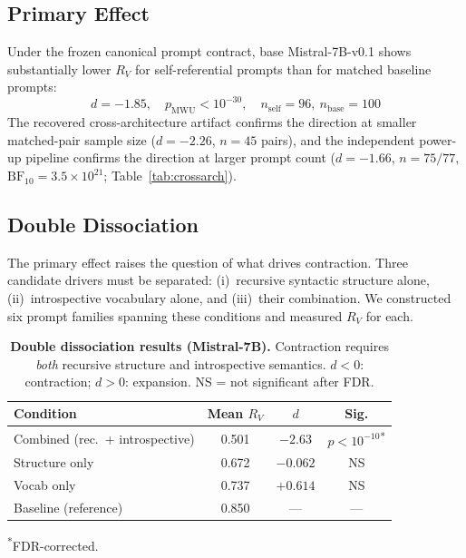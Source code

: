 \documentclass{article}
\newcommand{\RV}{R_V}
\newcommand{\dcohen}{d}
\begin{document}
\subsection{Primary Effect}
\label{sec:primary}

Under the frozen canonical prompt contract, base Mistral-7B-v0.1 shows substantially lower $\RV$
for self-referential prompts than for matched baseline prompts:
\begin{equation}
\dcohen = -1.85, \quad p_{\mathrm{MWU}} < 10^{-30}, \quad n_\mathrm{self}=96,\ n_\mathrm{base}=100
\label{eq:primary}
\end{equation}
The recovered cross-architecture artifact confirms the direction at smaller matched-pair sample size
($\dcohen = -2.26$, $n = 45$ pairs), and the independent power-up pipeline confirms the direction
at larger prompt count
($\dcohen = -1.66$, $n = 75/77$, $\mathrm{BF}_{10} = 3.5 \times 10^{21}$;
Table~\ref{tab:crossarch}).

\subsection{Double Dissociation}
\label{sec:dissociation}


The primary effect raises the question of what drives contraction.
Three candidate drivers must be separated: (i)~recursive syntactic structure alone,
(ii)~introspective vocabulary alone, and (iii)~their combination.
We constructed six prompt families spanning these conditions and measured $\RV$ for each.

\begin{table}[ht]
\centering
\caption{\textbf{Double dissociation results (Mistral-7B).}
         Contraction requires \emph{both} recursive structure and introspective semantics.
         $\dcohen < 0$: contraction; $\dcohen > 0$: expansion. NS = not significant after FDR.}
\label{tab:dissociation}
\smallskip
\small
\begin{tabular}{lccc}
\toprule
\textbf{Condition} & \textbf{Mean $\RV$} & \textbf{$\dcohen$} & \textbf{Sig.} \\
\midrule
Combined (rec.\ + introspective) & 0.501 & $-2.63$ & $p < 10^{-10}$\textsuperscript{*} \\
Structure only             & 0.672 & $-0.062$ & NS \\
Vocab only                 & 0.737 & $+0.614$ & NS \\
\midrule
Baseline (reference)       & 0.850 & --- & --- \\
\bottomrule
\end{tabular}

\vspace{1mm}\raggedright\footnotesize\textsuperscript{*}FDR-corrected.
\end{table}
\end{document}
